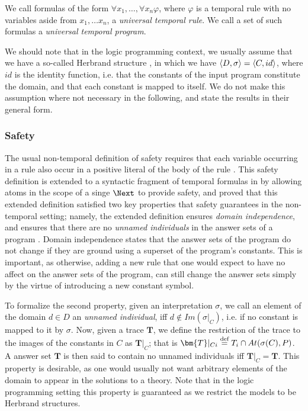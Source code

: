 \begin{definition} We call
  formulas of the form $\forall x_1, \dots, \forall x_n \varphi$,
  where $\varphi$ is a temporal rule with no variables aside from
  $x_1, \dots x_n$, a \emph{universal temporal rule}. We call a set of
  such formulas a \emph{universal temporal program}.
\end{definition}

We should note that in the logic programming context, we usually
assume that we have a so-called Herbrand structure \cite{peaval06a},
in which we have $\langle D, \sigma \rangle = \langle C, id \rangle$, where $id$ is the
identity function, i.e. that the constants of the input program
constitute the domain, and that each constant is mapped to itself. We
do not make this assumption where not necessary in the following, and
state the results in their general form.

\subsubsection{Safety}

The usual non-temporal definition of safety requires that each
variable occurring in a rule also occur in a positive literal of the
body of the rule \cite{gekakasc12a}. This safety definition is
extended to a syntactic fragment of temporal formulas in
\cite{agcapevidi17a} by allowing atoms in the scope of a singe $\Next$
to provide safety, and proved that this extended definition satisfied
two key properties that safety guarantees in the non-temporal setting;
namely, the extended definition ensures \emph{domain independence},
and ensures that there are no \emph{unnamed individuals} in the answer
sets of a program \cite{capeva09a} \cite{capeva09b}. Domain
independence states that the answer sets of the program do not change
if they are ground using a superset of the program's constants. This
is important, as otherwise, adding a new rule that one would expect to
have no affect on the answer sets of the program, can still change the
answer sets simply by the virtue of introducing a new constant symbol.

To formalize the second property, given an interpretation $\sigma$, we
call an element of the domain $d \in D$ an \emph{unnamed individual},
iff $d \not\in Im(\sigma\vert_{C})$, i.e. if no constant is mapped to
it by $\sigma$. Now, given a trace $\bm{T}$, we define the restriction
of the trace to the images of the constants in $C$ as
$\bm{T}\vert _C$; that is
$\bm{T}\vert_{Ci} \defeq T_i \cap At(\sigma(C),P)$. A answer set
$\bm{T}$ is then said to contain no unnamed individuals iff
$\bm{T} \vert_{C} = \bm{T}$. This property is desirable, as one would
usually not want arbitrary elements of the domain to appear in the
solutions to a theory. Note that in the logic programming setting this
property is guaranteed as we restrict the models to be Herbrand
structures.

